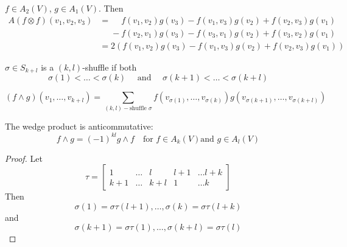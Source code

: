 \begin{frame}
  \begin{example}
    $f \in A_2(V)$, $g \in A_1(V)$. Then
    \begin{align*}
      A(f \otimes f) (v_1, v_2, v_3) &=
      \phantom{-}
      f(v_1,v_2)g(v_3) - f(v_1, v_3)g(v_2) + f(v_2, v_3) g(v_1) \\
      &\phantom{=}-
      f(v_2,v_1)g(v_3) - f(v_3, v_1)g(v_2) + f(v_3, v_2) g(v_1) \\
      &=2(
      f(v_1,v_2)g(v_3) - f(v_1, v_3)g(v_2) + f(v_2, v_3) g(v_1) )
    \end{align*}
  \end{example}
  \begin{definition}
    $\sigma \in S_{k+l}$ is a $(k,l)$-shuffle if both
    \begin{displaymath}
      \sigma(1) < \dots < \sigma(k)
      \quad \text{ and } \quad
      \sigma(k+1) < \dots < \sigma(k+l)
    \end{displaymath}
  \end{definition}
  \begin{prop}
    \begin{displaymath}
      (f \wedge g)(v_1, \dots, v_{k+l}) = \sum_{(k,l)-\text{shuffle } \sigma}
      f(v_{\sigma(1)}, \dots, v_{\sigma(k)})
      g(v_{\sigma(k+1)}, \dots, v_{\sigma(k+l)})
    \end{displaymath}
  \end{prop}
\end{frame}
\begin{frame}
  The wedge product is anticommutative:
  \begin{displaymath}
    f \wedge g = (-1)^{kl} g \wedge f \quad \text{for $f \in A_k(V)$
    and $g \in A_l(V)$}
  \end{displaymath}
  \begin{proof}
    Let 
    \begin{displaymath}
      \tau = 
      \begin{bmatrix}
        1 & \dots & l & l+1 & \dots l+k \\
        k+1 & \dots & k+ l & 1 & \dots k
      \end{bmatrix}
    \end{displaymath}
    Then
    \begin{displaymath}
      \sigma(1) = \sigma \tau(l+1), \dots, \sigma(k) = \sigma \tau(l+k)
    \end{displaymath}
    and
    \begin{displaymath}
      \sigma(k+1) = \sigma \tau(1), \dots, \sigma(k+l) = \sigma \tau(l)
    \end{displaymath}
  \end{proof}
\end{frame}

